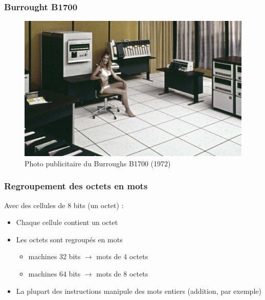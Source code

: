 \begin{frame}
 \frametitle{Burrought B1700}
 \begin{figure}[htbp]
\begin{center}
\includegraphics[width=.9\textwidth]{../illustration/BurroughtB1700.jpg}
\caption{Photo publicitaire du Burroughs B1700 (1972)\cite{B1700}}
\label{default}
\end{center}
\end{figure}
\end{frame}

\begin{frame}
\frametitle{Regroupement des octets en mots}
Avec des cellules de 8 bits (un octet) :
\begin{itemize}
\item Chaque cellule contient un octet
\item Les octets sont regroupés en mots
\begin{itemize}
\item machines 32 bits $\rightarrow$ mots de 4 octets
\item machines 64 bits $\rightarrow$ mots de 8 octets
\end{itemize}
\item La plupart des instructions manipule des mots entiers (addition, par exemple)
\end{itemize}
\end{frame}


